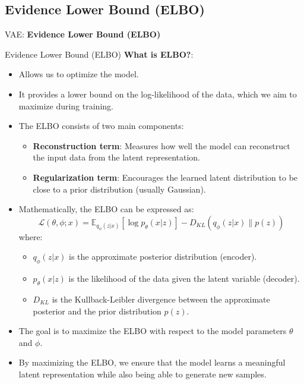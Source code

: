 \subsection{Evidence Lower Bound (ELBO)}
\begin{frame}{}
    \LARGE VAE: \textbf{Evidence Lower Bound (ELBO)}
\end{frame}

\begin{frame}[allowframebreaks]{Evidence Lower Bound (ELBO)}
\textbf{What is ELBO?}:
\begin{itemize}
    \item Allows us to optimize the model.
    \item It provides a lower bound on the log-likelihood of the data, which we aim to maximize during training.
    \item The ELBO consists of two main components:
    \begin{itemize}
        \item \textbf{Reconstruction term}: Measures how well the model can reconstruct the input data from the latent representation.
        \item \textbf{Regularization term}: Encourages the learned latent distribution to be close to a prior distribution (usually Gaussian).
    \end{itemize}
    \framebreak
    \item Mathematically, the ELBO can be expressed as:
    \[
    \mathcal{L}(\theta, \phi; x) = \mathbb{E}_{q_\phi(z|x)}[\log p_\theta(x|z)] - D_{KL}(q_\phi(z|x) \| p(z))
    \]
    where:
    \begin{itemize}
        \item \( q_\phi(z|x) \) is the approximate posterior distribution (encoder).
        \item \( p_\theta(x|z) \) is the likelihood of the data given the latent variable (decoder).
        \item \( D_{KL} \) is the Kullback-Leibler divergence between the approximate posterior and the prior distribution \( p(z) \).
    \end{itemize}
    \item The goal is to maximize the ELBO with respect to the model parameters \( \theta \) and \( \phi \).
    \item By maximizing the ELBO, we ensure that the model learns a meaningful latent representation while also being able to generate new samples.
\end{itemize}


\end{frame}
